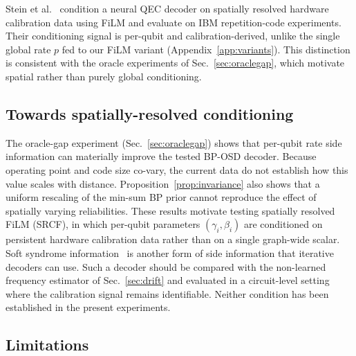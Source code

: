 \documentclass[a4paper,twocolumn,11pt,nopdfoutputerror]{quantumarticle}
\begin{document}
Stein et al.~\cite{Stein2026FiLM} condition a neural QEC decoder on
spatially resolved hardware calibration data using FiLM and evaluate on
IBM repetition-code experiments. Their conditioning signal is per-qubit
and calibration-derived, unlike the single global rate $p$ fed to our
FiLM variant (Appendix~\ref{app:variants}). This distinction is consistent with the oracle experiments
of Sec.~\ref{sec:oraclegap}, which motivate spatial rather than purely
global conditioning.
\subsection{Towards spatially-resolved conditioning}\label{sec:srcf}

The oracle-gap experiment (Sec.~\ref{sec:oraclegap}) shows that
per-qubit rate side information can materially improve the tested
BP-OSD decoder. Because operating point and code size co-vary, the
current data do not establish how this value scales with distance.
Proposition~\ref{prop:invariance} also shows that a uniform rescaling
of the min-sum BP prior cannot reproduce the effect of spatially varying
reliabilities. These results motivate testing spatially resolved FiLM
(SRCF), in which per-qubit parameters $(\gamma_i, \beta_i)$ are
conditioned on persistent hardware calibration data rather than on a
single graph-wide scalar. Soft syndrome information~\cite{Raveendran2023Soft}
is another form of side information that iterative decoders can use. Such
a decoder should be compared with the
non-learned frequency estimator of Sec.~\ref{sec:drift} and evaluated
in a circuit-level setting where the calibration signal remains
identifiable. Neither condition has been established in the present
experiments.

\subsection{Limitations}\label{sec:limitations}
\end{document}
